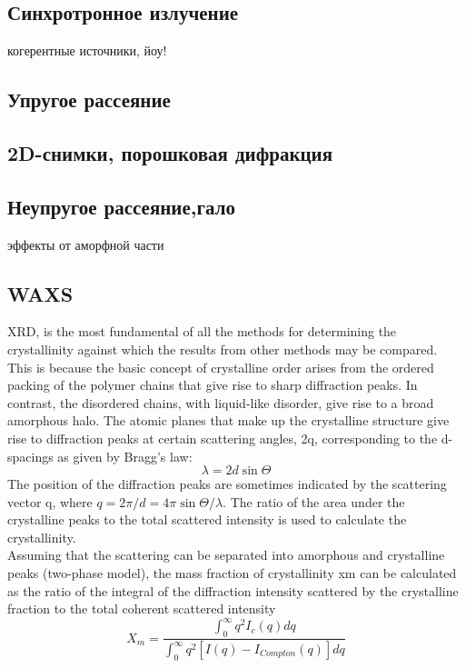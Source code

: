 \subsection{Синхротронное излучение}
когерентные источники, йоу!
\subsection{Упругое рассеяние}
\subsection{2D-снимки, порошковая дифракция}
\subsection{Неупругое рассеяние,гало}
эффекты от аморфной части
\subsection{WAXS}
XRD, is the most fundamental of all
the methods for determining the crystallinity against which the results from
other methods may be compared.\\
This is because the basic concept of crystalline
order arises from the ordered packing of the polymer chains that give rise to sharp
diffraction peaks. In contrast, the disordered chains, with liquid-like disorder, give
rise to a broad amorphous halo. The atomic planes that make up the crystalline
structure give rise to diffraction peaks at certain scattering angles, 2q, corresponding
to the d-spacings as given by Bragg’s law:
\[
\lambda = 2d \sin \Theta
\]
The position of the diffraction peaks are sometimes indicated by the scattering vector q, where $q = 2\pi/d = 4\pi \sin \Theta / \lambda$. The ratio of the area under the crystalline peaks
to the total scattered intensity is used to calculate the crystallinity.\\
Assuming that the scattering can be separated into amorphous and crystalline
peaks (two-phase model), the mass fraction of crystallinity xm can be calculated
as the ratio of the integral of the diffraction intensity scattered by the crystalline fraction
to the total coherent scattered intensity
\[
X_m = \frac{\int_0^{\infty} q^2 I_c(q) dq}{\int_0^{\infty} q^2 [I(q) - I_{Compton}(q)] dq}
\]

